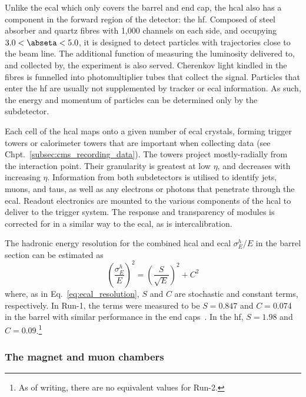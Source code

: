 Unlike the \acrshort{ecal} which only covers the barrel and end cap, the \acrshort{hcal} also has a component in the forward region of the detector: the \acrfull{hf}. Composed of steel absorber and quartz fibres with 1,000 channels on each side, and occupying $\text{3.0} < \abseta < \text{5.0}$, it is designed to detect particles with trajectories close to the beam line. The additional function of measuring the luminosity delivered to, and collected by, the experiment is also served. Cherenkov light kindled in the fibres is funnelled into photomultiplier tubes that collect the signal. Particles that enter the \acrshort{hf} are usually not supplemented by tracker or \acrshort{ecal} information. As such, the energy and momentum of particles can be determined only by the subdetector.

Each cell of the \acrshort{hcal} maps onto a given number of \acrshort{ecal} crystals, forming trigger towers or calorimeter towers that are important when collecting data (see Chpt.~\ref{subsec:cms_recording_data}). The towers project mostly-radially from the interaction point. Their granularity is greatest at low $\eta$, and decreases with increasing $\eta$. Information from both subdetectors is utilised to identify \glspl{jet}, muons, and taus, as well as any electrons or photons that penetrate through the \acrshort{ecal}. Readout electronics are mounted to the various components of the \acrshort{hcal} to deliver to the trigger system. The response and transparency of modules is corrected for in a similar way to the \acrshort{ecal}, as is intercalibration.

The hadronic energy resolution for the combined \acrshort{hcal} and \acrshort{ecal} $\sigma_E^h/E$ in the barrel section can be estimated as
\begin{equation}
    \left( \frac{\sigma_E^h}{E} \right)^2 = \left( \frac{S}{\sqrt{E}} \right)^2 + C^2
    \label{eq:hcal_resolution}
\end{equation}
where, as in Eq.~\ref{eq:ecal_resolution}, $S$ and $C$ are stochastic and constant terms, respectively. In Run-1, the terms were measured to be $S = \text{0.847}$ and $C = \text{0.074}$ in the barrel with similar performance in the end caps~\cite{cms_hcal_per_2010}. In the \acrshort{hf}, $S = \text{1.98}$ and $C = \text{0.09}$.\footnote{As of writing, there are no equivalent values for Run-2.}




\subsubsection{The magnet and muon chambers}
\label{subsubsec:cms_magnet_muons}

